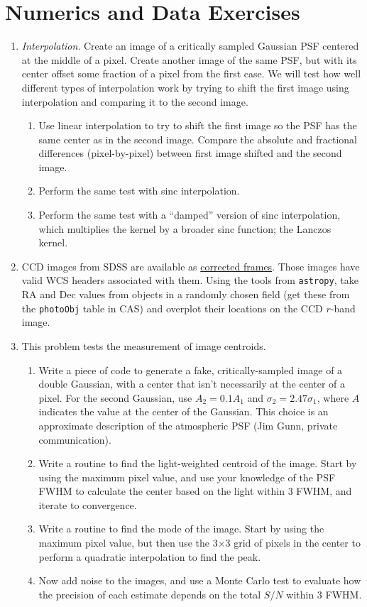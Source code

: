 \section{Numerics and Data Exercises}

\begin{enumerate}
\item {\it Interpolation}. Create an image of a critically sampled
    Gaussian PSF centered at the middle of a pixel. Create another
    image of the same PSF, but with its center offset some fraction of
    a pixel from the first case. We will test how well different types
    of interpolation work by trying to shift the first image using
    interpolation and comparing it to the second image.
\begin{enumerate}
\item Use linear interpolation to try to shift the first image
    so the PSF has the same center as in the second image. Compare the
    absolute and fractional differences (pixel-by-pixel) between first
    image shifted and the second image.
\item
    Perform the same test with sinc interpolation.
\item Perform the same test with a ``damped'' version of sinc
    interpolation, which multiplies the kernel by a broader sinc
    function; the Lanczos kernel.
\end{enumerate}
\item CCD images from SDSS are available
as \href{https://www.sdss.org/dr14/imaging/images/#corr}{corrected
frames}. Those images have valid WCS headers associated with
them. Using the tools from {\tt astropy}, take RA and Dec values from
objects in a randomly chosen field (get these from the {\tt photoObj}
table in CAS) and overplot their locations on the CCD $r$-band image.
\item This problem tests the measurement of image centroids.
\begin{enumerate}
\item Write a piece of code to generate a fake, critically-sampled
image of a double Gaussian, with a center that isn't necessarily at
the center of a pixel. For the second Gaussian, use $A_2 = 0.1 A_1$
and $\sigma_2 = 2.47\sigma_1$, where $A$ indicates the value at the
center of the Gaussian. This choice is an approximate description of
the atmospheric PSF (Jim Gunn, private communication).
\item Write a routine to find the light-weighted centroid of the
image. Start by using the maximum pixel value, and use your knowledge
of the PSF FWHM to calculate the center based on the light within 3
FWHM, and iterate to convergence.
\item Write a routine to find the mode of the image. Start by using
the maximum pixel value, but then use the 3$\times$3 grid of pixels in
the center to perform a quadratic interpolation to find the peak. 
\item Now add noise to the images, and use a Monte Carlo test to
evaluate how the precision of each estimate depends on the total $S/N$
within 3 FWHM.
\end{enumerate}
\end{enumerate}


  
